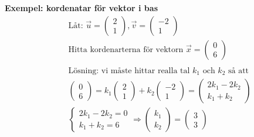 \textbf{Exempel: kordenatar för vektor i bas}
\begin{align*}
  &\quad \text{Låt: }
  \vec{u}=\begin{pmatrix}  2 \\  1   \end{pmatrix},
  \vec{v}=\begin{pmatrix}  -2 \\  1   \end{pmatrix} \\
  &\quad  \text{Hitta kordenarterna för vektorn }
  \vec{x}=\begin{pmatrix}  0 \\  6   \end{pmatrix} \\
  &\quad \\
  &\quad  \text{Lösning: vi måste hittar realla tal $k_1$ och $k_2$ så att } \\
  &\quad
  \begin{pmatrix}  0 \\  6   \end{pmatrix} =
  k_1\begin{pmatrix}  2 \\  1   \end{pmatrix} 
  +k_2\begin{pmatrix}  -2 \\  1   \end{pmatrix} =
  \begin{pmatrix}  2k_1-2k_2 \\  k_1+k_2   \end{pmatrix} \\
  &\quad 
  \left\{\begin{array}{r}
  2k_1-2k_2 = 0 \\
  k_1+k_2 = 6 
  \end{array}\right. \Rightarrow{}
  \begin{pmatrix}  k_1 \\  k_2   \end{pmatrix} =  \begin{pmatrix}  3 \\  3   \end{pmatrix} \\
\end{align*}


